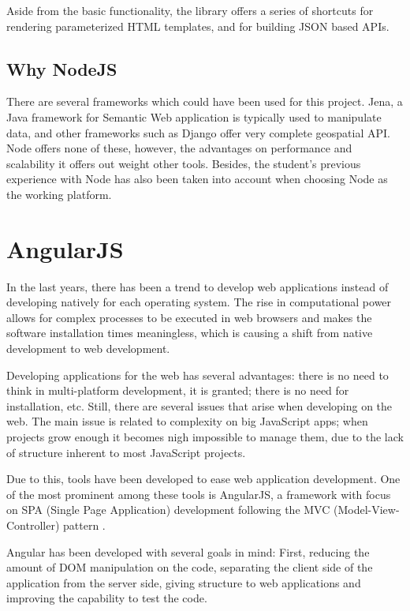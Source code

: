 Aside from the basic functionality, the library offers a series of shortcuts for rendering parameterized HTML templates, and for building JSON based APIs.

\subsection*{Why NodeJS}

There are several frameworks which could have been used for this project. Jena, a Java framework for Semantic Web application is typically used to manipulate data, and other frameworks such as Django offer very complete geospatial API. Node offers none of these, however, the advantages on performance and scalability it offers out weight other tools. Besides, the student's previous experience with Node has also been taken into account when choosing Node as the working platform.
 
\section*{AngularJS}\label{sec:angular}

In the last years, there has been a trend to develop web applications instead of developing natively for each operating system. The rise in computational power allows for complex processes to be executed in web browsers and makes the software installation times meaningless, which is causing a shift from native development to web development.

Developing applications for the web has several advantages: there is no need to think in multi-platform development, it is granted; there is no need for installation, etc. Still, there are several issues that arise when developing on the web. The main issue is related to complexity on big JavaScript apps; when projects grow enough it becomes nigh impossible to manage them, due to the lack of structure inherent to most JavaScript projects.

Due to this, tools have been developed to ease web application development. One of the most prominent among these tools is AngularJS, a framework with focus on SPA (Single Page Application) development following the MVC (Model-View-Controller) pattern \cite{angularjs1, angularjs2}.

Angular has been developed with several goals in mind: First, reducing the amount of DOM manipulation on the code, separating the client side of the application from the server side, giving structure to web applications and improving the capability to test the code.

